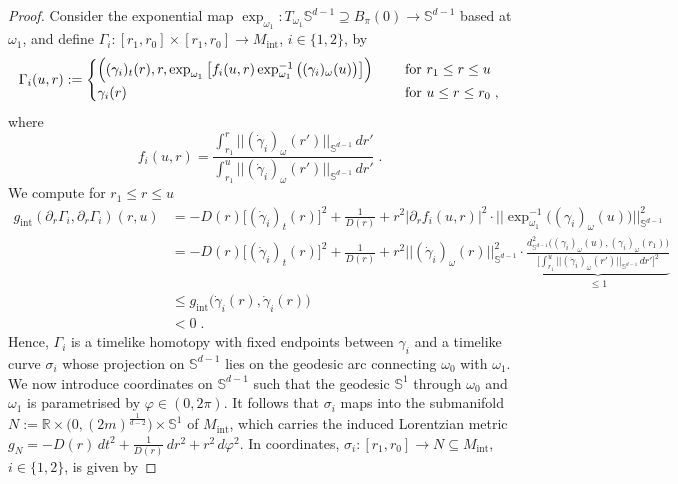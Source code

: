 \documentclass[reqno]{article}
\newcommand{\R}{\mathbb{R}}
\newcommand{\Sd}{\mathbb{S}^{d-1}}
\newcommand{\Mint}{M_{\mathrm{int}}}
\newcommand{\gint}{g_{\mathrm{int}}}
\begin{document}
\begin{proof}
Consider the exponential map $\exp_{\omega_1} : T_{\omega_1} \Sd \supseteq B_\pi (0) \to \Sd$ based at $\omega_1$, and define $\Gamma_i : [r_1, r_0] \times [r_1, r_0] \to \Mint$, $i \in \{1,2\}$, by
\begin{equation*}
\Gamma_i(u,r) := \begin{cases} \Big( (\gamma_i)_t(r) , r , \exp_{\omega_1} \big[ f_i(u,r) \exp_{\omega_1}^{-1} \big( (\gamma_i)_\omega(u)\big) \big] \Big) \quad &\textnormal{ for } r_1 \leq r \leq u \\
\gamma_i(r) &\textnormal{ for } u \leq r \leq r_0\;,\end{cases}
\end{equation*}
where
\begin{equation*}
f_i(u,r) = \frac{\int_{r_1}^r || (\dot{\gamma}_i)_\omega(r') ||_{\Sd} \, dr' }{ \int_{r_1}^u || (\dot{\gamma}_i)_\omega(r')||_{\Sd} \, dr'} \;.
\end{equation*}
We compute for $r_1 \leq r \leq u$
\begin{equation*}
\begin{split}
\gint(\partial_r \Gamma_i, \partial_r \Gamma_i)(r,u) &= - D(r)\big[(\dot{\gamma}_i)_t(r)\big]^2 + \frac{1}{D(r)} + r^2 | \partial_r f_i(u,r)|^2 \cdot ||\exp_{\omega_1}^{-1}\big((\gamma_i)_\omega(u)\big)||^2_{\Sd} \\
&=- D(r)\big[(\dot{\gamma}_i)_t(r)\big]^2 + \frac{1}{D(r)} + r^2 ||(\dot{\gamma}_i)_\omega(r)||^2_{\Sd} \cdot \underbrace{\frac{d^2_{\Sd}\big((\gamma_i)_\omega(u), (\gamma_i)_\omega(r_1)\big)}{\Big[\int_{r_1}^u || (\dot{\gamma}_i)_\omega(r') ||_{\Sd}\, dr' \Big]^2}}_{\leq 1}  \\
&\leq \gint\big(\dot{\gamma}_i(r), \dot{\gamma}_i(r)\big) \\
&< 0 \;.
\end{split}
\end{equation*}
Hence, $\Gamma_i$ is a timelike homotopy with fixed endpoints between $\gamma_i$ and a timelike curve $\sigma_i$ whose projection on $\Sd$ lies on the geodesic arc connecting $\omega_0$ with $\omega_1$. We now introduce coordinates on $\Sd$ such that the geodesic $\mathbb{S}^1$ through $\omega_0$ and $\omega_1$ is parametrised by $\varphi \in (0,2\pi)$. It follows that $\sigma_i$ maps into the submanifold $N:= \R \times \big(0, (2m)^{\frac{1}{d-2}}\big) \times \mathbb{S}^1$ of $\Mint$, which carries the induced Lorentzian metric $g_N = - D(r) \, dt^2 + \frac{1}{D(r)} \, dr^2 + r^2 \, d\varphi^2 $. In coordinates, $\sigma_i : [r_1, r_0] \to N \subseteq \Mint$, $i \in \{1,2\}$, is given by 

\end{proof}
\end{document}
